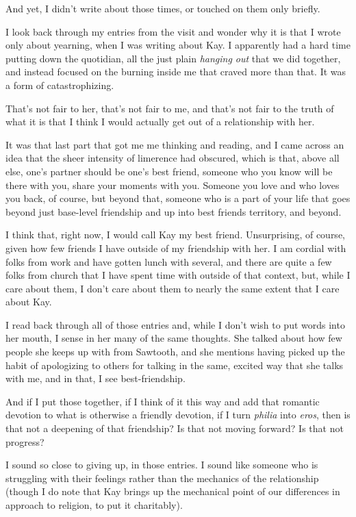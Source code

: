 And yet, I didn't write about those times, or touched on them only briefly.

I look back through my entries from the visit and wonder why it is that I wrote only about yearning, when I was writing about Kay. I apparently had a hard time putting down the quotidian, all the just plain \emph{hanging out} that we did together, and instead focused on the burning inside me that craved more than that. It was a form of catastrophizing.

That's not fair to her, that's not fair to me, and that's not fair to the truth of what it is that I think I would actually get out of a relationship with her.

It was that last part that got me me thinking and reading, and I came across an idea that the sheer intensity of limerence had obscured, which is that, above all else, one's partner should be one's best friend, someone who you know will be there with you, share your moments with you. Someone you love and who loves you back, of course, but beyond that, someone who is a part of your life that goes beyond just base-level friendship and up into best friends territory, and beyond.

I think that, right now, I would call Kay my best friend. Unsurprising, of course, given how few friends I have outside of my friendship with her. I am cordial with folks from work and have gotten lunch with several, and there are quite a few folks from church that I have spent time with outside of that context, but, while I care about them, I don't care about them to nearly the same extent that I care about Kay.

I read back through all of those entries and, while I don't wish to put words into her mouth, I sense in her many of the same thoughts. She talked about how few people she keeps up with from Sawtooth, and she mentions having picked up the habit of apologizing to others for talking in the same, excited way that she talks with me, and in that, I see best-friendship.

And if I put those together, if I think of it this way and add that romantic devotion to what is otherwise a friendly devotion, if I turn \emph{philia} into \emph{eros}, then is that not a deepening of that friendship? Is that not moving forward? Is that not progress?

I sound so close to giving up, in those entries. I sound like someone who is struggling with their feelings rather than the mechanics of the relationship (though I do note that Kay brings up the mechanical point of our differences in approach to religion, to put it charitably).


